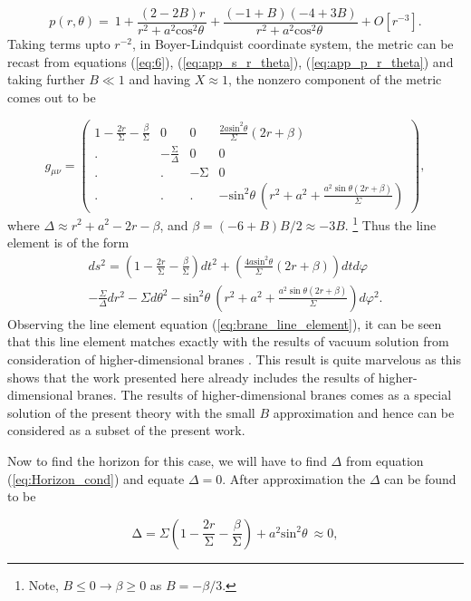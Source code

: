 \documentclass[12pt,a4paper,oneside]{book}
\newcommand{\eq}[2]{\begin{equation} \label{eq:#1} #2 \end{equation}}
\newcommand{\meq}[2]{\begin{multline}\label{eq:#1} #2 \end{multline}}
\newcommand{\Eref}[1]{(\ref{eq:#1})}
\begin{document}
\eq{app_p_r_theta}{p\left(r,\theta \right)=\ 1+\frac{(2-2B)r}{r^2+a^2{{\mathrm{cos}}^{\mathrm{2}} \theta \ }}+\frac{(-1+B)(-4+3B)}{r^2+a^2{{\mathrm{cos}}^{\mathrm{2}} \theta \ }}+O\left[r^{-3}\right].}
Taking terms upto $r^{-2}$, in Boyer-Lindquist coordinate system, the metric can be recast from equations \Eref{6}, \Eref{app_s_r_theta}, \Eref{app_p_r_theta} and taking further $B\ll 1$ and having $X\approx1$, the nonzero component of the metric comes out to be

\eq{}{g_{\mu \nu }=\left( \begin{array}{cccc}
1-\frac{2r}{\mathrm{\Sigma }}-\frac{\beta}{\mathrm{\Sigma }}& 0 & 0 & \frac{2a{{\mathrm{sin}}^{\mathrm{2}} \theta}}{\Sigma}(2r+\beta) \\ 
. & -\frac{\mathrm{\Sigma }}{\Delta} & 0 & 0 \\ 
. & . & \mathrm{-}\mathrm{\Sigma } & 0 \\ 
. & . & . & -{{\mathrm{sin}}^{\mathrm{2}} \theta \ }\left( r^2 + a^2 +  \frac{a^2\sin{\theta}(2r+\beta)}{\Sigma}\right) \end{array}
\right),}
\noindent where $\Delta \approx r^2 + a^2 -2r -\beta$, and $\beta=\left(-6+B\right)B/2\approx-3B$. \footnote{Note, $B\le 0\to \beta\ge 0$ as $B=-\beta/3$.}
Thus the line element is of the form
\meq{brane_line_element}{ds^2 = \left(1-\frac{2r}{\mathrm{\Sigma }}-\frac{\beta}{\mathrm{\Sigma }}\right) dt^2 + \left(\frac{4a{{\mathrm{sin}}^{\mathrm{2}}  \theta}}{\Sigma}(2r+\beta)\right) dt d\varphi 
\\-\frac{\Sigma}{\Delta}dr^2 - \Sigma d\theta^2 -{{\mathrm{sin}}^{\mathrm{2}} \theta \ }\left( r^2 + a^2+ \frac{a^2\sin{\theta}(2r+\beta)}{\Sigma}\right)d\varphi^2 .}
Observing the line element equation \Eref{brane_line_element}, it can be seen that this line element matches exactly with the results of vacuum solution from consideration of higher-dimensional branes \cite{Charged_BH_Brane, BH_Brane}. This result is quite marvelous as this shows that the work presented here already includes the results of higher-dimensional branes. The results of higher-dimensional branes comes as a special solution of the present theory with the small $B$ approximation and hence can be considered as a subset of the present work.

Now to find the horizon for this case, we will have to find $\Delta$ from equation \Eref{Horizon_cond} and equate $\Delta = 0$. After approximation the $\Delta$ can be found to be 

\eq{}{\mathrm\Delta={\Sigma }\left(1-\frac{2r}{\mathrm{\Sigma }}-\frac{\beta}{\mathrm{\Sigma }}\right)+a^2{{\mathrm{sin}}^2 \theta \ }\approx0,}
\end{document}
